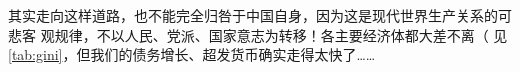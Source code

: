 其实走向这样道路，也不能完全归咎于中国自身，因为这是现代世界生产关系的可悲客
观规律，不以人民、党派、国家意志为转移！各主要经济体都大差不离（
见\cref{tab:gini}，但我们的债务增长、超发货币确实走得太快了……



% 

















